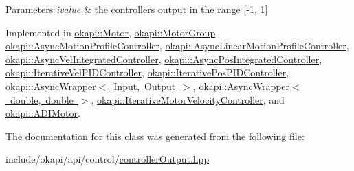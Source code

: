 \begin{DoxyParams}{Parameters}
{\em ivalue} & the controller\textquotesingle{}s output in the range \mbox{[}-\/1, 1\mbox{]} \\
\hline
\end{DoxyParams}


Implemented in \mbox{\hyperlink{classokapi_1_1Motor_a262c36a80a942d125e574d691b77b440}{okapi\+::\+Motor}}, \mbox{\hyperlink{classokapi_1_1MotorGroup_a9da308795bb956d5f7f3f7885a727d8e}{okapi\+::\+Motor\+Group}}, \mbox{\hyperlink{classokapi_1_1AsyncMotionProfileController_a292b22f53ed0ef67a479e00c92f68e3f}{okapi\+::\+Async\+Motion\+Profile\+Controller}}, \mbox{\hyperlink{classokapi_1_1AsyncLinearMotionProfileController_a45b62483002333a2d99deea8de2af43e}{okapi\+::\+Async\+Linear\+Motion\+Profile\+Controller}}, \mbox{\hyperlink{classokapi_1_1AsyncVelIntegratedController_ae50c09f44077284278e4d8a80656077d}{okapi\+::\+Async\+Vel\+Integrated\+Controller}}, \mbox{\hyperlink{classokapi_1_1AsyncPosIntegratedController_aaa8d694c814e7b419dfb55b3e3a1d72e}{okapi\+::\+Async\+Pos\+Integrated\+Controller}}, \mbox{\hyperlink{classokapi_1_1IterativeVelPIDController_a50c069752036261395871fbe175ae101}{okapi\+::\+Iterative\+Vel\+P\+I\+D\+Controller}}, \mbox{\hyperlink{classokapi_1_1IterativePosPIDController_ab77771ba39d01e5f8d29984fd43abd38}{okapi\+::\+Iterative\+Pos\+P\+I\+D\+Controller}}, \mbox{\hyperlink{classokapi_1_1AsyncWrapper_aec6d1a4214bad2151bee23dc5e8076e7}{okapi\+::\+Async\+Wrapper$<$ Input, Output $>$}}, \mbox{\hyperlink{classokapi_1_1AsyncWrapper_aec6d1a4214bad2151bee23dc5e8076e7}{okapi\+::\+Async\+Wrapper$<$ double, double $>$}}, \mbox{\hyperlink{classokapi_1_1IterativeMotorVelocityController_a5a36064df12b3d34f2bfa09ca1992b9e}{okapi\+::\+Iterative\+Motor\+Velocity\+Controller}}, and \mbox{\hyperlink{classokapi_1_1ADIMotor_ac290a47e904c728ff1e61ee85408a1be}{okapi\+::\+A\+D\+I\+Motor}}.



The documentation for this class was generated from the following file\+:\begin{DoxyCompactItemize}
\item 
include/okapi/api/control/\mbox{\hyperlink{controllerOutput_8hpp}{controller\+Output.\+hpp}}\end{DoxyCompactItemize}
